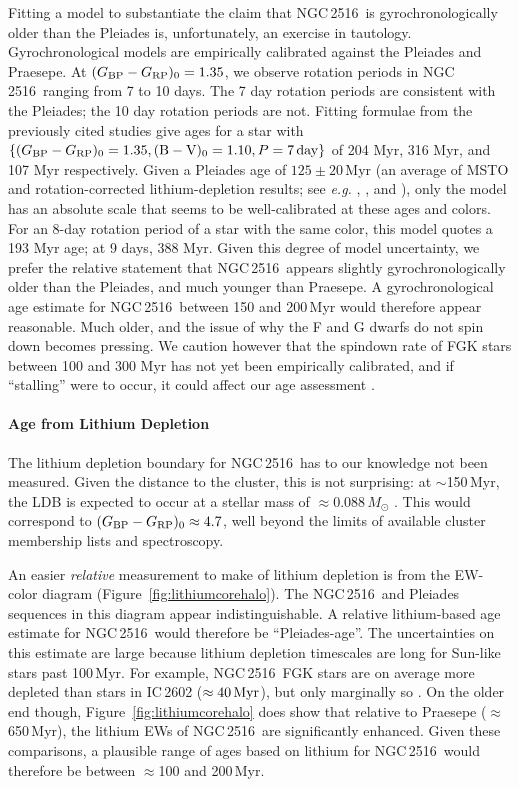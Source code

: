 \documentclass[12pt,twocolumn,tighten]{aastex63}
\newcommand{\cn}{NGC\,2516} %
\newcommand{\bpmrpo}{(G_{\rm BP}-G_{\rm RP})_0}
\begin{document}
Fitting a model to substantiate the claim that \cn\ is
gyrochronologically older than the Pleiades \citep[{\it e.g.},][]{mamajek_improved_2008,angus_toward_2019,spada_competing_2020}
is, unfortunately, an exercise in tautology.  Gyrochronological models
are empirically calibrated against the Pleiades and Praesepe.  At
$\bpmrpo=1.35$, we observe rotation periods in \cn\ ranging from 7 to
10 days.  The 7 day rotation periods are consistent with the Pleiades;
the 10 day rotation periods are not.  Fitting formulae from the
previously cited studies give ages for a star with $\{\bpmrpo=1.35,
(\mathrm{B}-\mathrm{V})_0=1.10, P=7\,{\rm day}\}$ of 204 Myr, 316 Myr,
and 107 Myr respectively.  Given a Pleiades age of $125\pm20$\,Myr (an
average of MSTO and rotation-corrected lithium-depletion results; see
{\it e.g.} \citealt{stauffer_keck_1998},
\citealt{soderblom_ages_2014}, and \citealt{cummings_2018}), only the
\citet{spada_competing_2020} model has an absolute scale that seems to
be well-calibrated at these ages and colors.  For an 8-day rotation
period of a star with the same color, this model quotes a 193 Myr age;
at 9 days, 388 Myr.  Given this degree of model uncertainty, we prefer
the relative statement that \cn\ appears slightly gyrochronologically
older than the Pleiades, and much younger than Praesepe.  A
gyrochronological age estimate for \cn\ between 150 and 200\,Myr would
therefore appear reasonable.  Much older, and the issue of why the F
and G dwarfs do not spin down becomes pressing.  We caution however
that the spindown rate of FGK stars between 100 and 300 Myr has not
yet been empirically calibrated, and if ``stalling'' were to occur, it
could affect our age assessment \citep[see][]{curtis_rup147_2020}.


\paragraph{Age from Lithium Depletion}
The lithium depletion boundary for \cn\ has to our knowledge not been
measured.  Given the distance to the cluster, this is not surprising:
at $\sim$150\,Myr, the LDB is expected to occur at a stellar mass of
$\approx$0.088\,$M_\odot$ \citep{soderblom_ages_2014}.  This would
correspond to $\bpmrpo\approx4.7$, well beyond the limits of available
cluster membership lists and spectroscopy.

An easier {\it relative} measurement to make of lithium depletion is
from the EW-color diagram (Figure~\ref{fig:lithiumcorehalo}).  The
\cn\ and Pleiades sequences in this diagram appear indistinguishable.
A relative lithium-based age estimate for \cn\ would therefore be
``Pleiades-age''.  The uncertainties on this estimate are large
because lithium depletion timescales are long for Sun-like stars past
100\,Myr.  For example,
\cn\ FGK stars are on average more depleted than stars in
IC\,2602 ($\approx40\,{\rm Myr}$), but only marginally so \citep{soderblom_ages_2014}.  On the
older end though, Figure~\ref{fig:lithiumcorehalo} does show that
relative to Praesepe ($\approx$650\,Myr), the lithium EWs of \cn\ are
significantly enhanced.  Given these comparisons, a plausible range of
ages based on lithium for \cn\ would therefore be between $\approx$100
and 200\,Myr.
\end{document}
